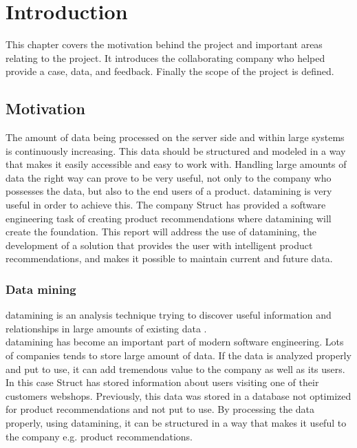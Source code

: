 
\chapter{Introduction} %

\label{ChapterX} %


This chapter covers the motivation behind the project and important areas relating to the project. It introduces the collaborating company who helped provide a case, data, and feedback. Finally the scope of the project is defined.

\section{Motivation}
The amount of data being processed on the server side and within large systems is continuously increasing. This data should be structured and modeled in a way that makes it easily accessible and easy to work with. Handling large amounts of data the right way can prove to be very useful, not only to the company who possesses the data, but also to the end users of a product. \gls{datamining} is very useful in order to achieve this.
The company \gls{Struct} has provided a software engineering task of creating product recommendations where \gls{datamining} will create the foundation. This report will address the use of \gls{datamining}, the development of a solution that provides the user with intelligent product recommendations, and makes it possible to maintain current and future data.

\subsection{Data mining}
\gls{datamining} is an analysis technique trying to discover useful information and relationships in large amounts of existing data \cite{dataminingSource}. \\  
\gls{datamining} has become an important part of modern software engineering. Lots of companies tends to store large amount of data. If the data is analyzed properly and put to use, it can add tremendous value to the company as well as its users. In this case \gls{Struct} has stored information about users visiting one of their customers webshops. Previously, this data was stored in a database not optimized for product recommendations and not put to use. By processing the data properly, using \gls{datamining}, it can be structured in a way that makes it useful to the company e.g. product recommendations.

